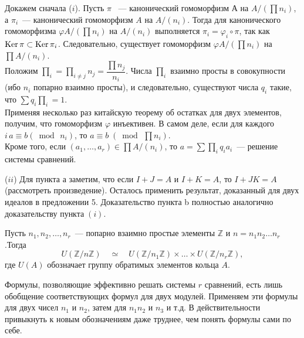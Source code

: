 \documentclass{../../template/mai_book}
\begin{document}
    \begin{myproof}
    Докажем сначала ($i$). Пусть $\pi$ ~— канонический гомоморфизм $А$ на $A/(\prod n_i)$, а $\pi_i$~— канонический гомоморфизм $A$ на $A/(n_i)$. Тогда для канонического гомоморфизма $\varphi A/(\prod n_i)$ на $A/(n_i)$ выполняется $\pi_i = \varphi_i \circ \pi$, так как $\operatorname{Ker} \pi \subset \operatorname{Ker} \pi_i$. Следовательно, существует гомоморфизм $\varphi A/(\prod n_i)$ \linebreak на $\prod A/(n_i)$.\\
    Положим $\prod_i = \prod\nolimits_{i \ne j}n_j = \dfrac {\prod n_j} {n_i}$. Числа $\prod_i$ взаимно просты в совокупности (ибо $n_i$ попарно взаимно просты), и следовательно, существуют числа $q_i$ такие, что $\sum q_i \prod\nolimits_i = 1$.\\
    Применяя несколько раз китайскую теорему об остатках для двух элементов, получим, что гомоморфизм $\varphi$ инъективен. В самом деле, если для каждого $i\,a \equiv b (\bmod\,n_i)$, то $a \equiv b\;(\bmod\,\prod n_i)$.\\
    Кроме того, если $(a_1, \ldots, a_r) \in \prod A/ (n_i)$, то $a = \sum\prod_i q_i a_i$~— решение системы сравнений.

    \noindent ($ii$) Для пункта а заметим, что если $I + J = A$ и $I + K = A$, то $I + JK = A$ (рассмотреть произведение). Осталось применить результат, доказанный для двух идеалов в предложении 5. Доказательство пункта b полностью аналогично доказательству пункта$\;(i)$.
    \end{myproof}

    \begin{sled}
    \hspace*{0.5cm}
    Пусть $n_1, n_2, \ldots, n_r$~— попарно взаимно простые элементы \linebreak $\mathbb{Z}$ и $n = n_1n_2\ldots n_r$.\;Тогда
    $$U(\mathbb{Z}/n\mathbb{Z})\quad \simeq \quad U(\mathbb{Z}/n_1\mathbb{Z}) \times \ldots \times U(\mathbb{Z}/n_r\mathbb{Z}),$$
    где $U(A)$ обозначает группу обратимых элементов кольца $A$.
    \end{sled}

    Формулы, позволяющие эффективно решать системы $r$ сравнений, есть лишь обобщение соответствующих формул для двух модулей. Применяем эти формулы для двух чисел $n_1$ и $n_2$, затем для $n_1n_2$ и $n_3$ и т.д. В действительности привыкнуть к новым обозначениям даже труднее, чем понять формулы сами по себе.
\end{document}
